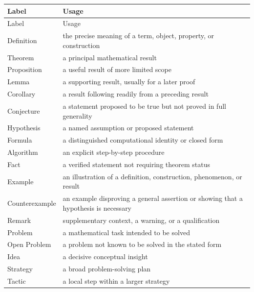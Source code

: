     {\small
    \renewcommand{\arraystretch}{1.18}
    \begin{longtable}{@{}L{0.24\textwidth}L{0.68\textwidth}@{}}
        \toprule
        Label & Usage \\
        \midrule
        \endfirsthead

        \toprule
        Label & Usage \\
        \midrule
        \endhead

        \bottomrule
        \endlastfoot

        Definition & the precise meaning of a term, object, property, or construction \\
        Theorem & a principal mathematical result \\
        Proposition & a useful result of more limited scope \\
        Lemma & a supporting result, usually for a later proof \\
        Corollary & a result following readily from a preceding result \\
        Conjecture & a statement proposed to be true but not proved in full generality \\
        Hypothesis & a named assumption or proposed statement \\
        Formula & a distinguished computational identity or closed form \\
        Algorithm & an explicit step-by-step procedure \\
        Fact & a verified statement not requiring theorem status \\
        Example & an illustration of a definition, construction, phenomenon, or result \\
        Counterexample & an example disproving a general assertion or showing that a hypothesis is necessary \\
        Remark & supplementary context, a warning, or a qualification \\
        Problem & a mathematical task intended to be solved \\
        Open Problem & a problem not known to be solved in the stated form \\
        Idea & a decisive conceptual insight \\
        Strategy & a broad problem-solving plan \\
        Tactic & a local step within a larger strategy \\
    \end{longtable}
    }

